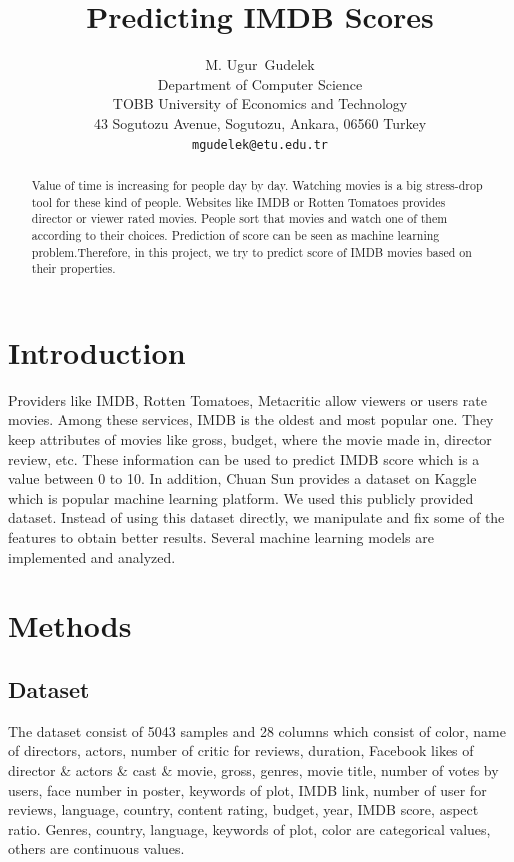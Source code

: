 \documentclass{article}
\title{Predicting IMDB Scores}
\author{
  M. Ugur~Gudelek\\
  Department of Computer Science\\
  TOBB University of Economics and Technology\\
  43 Sogutozu Avenue, Sogutozu, Ankara, 06560 Turkey \\
  \texttt{mgudelek@etu.edu.tr} \\
}
\begin{document}

\maketitle

\begin{abstract}
  Value of time is increasing for people day by day. Watching movies is a big stress-drop tool for these kind of people. Websites like IMDB or Rotten Tomatoes provides director or viewer rated movies. People sort that movies and watch one of them according to their choices. Prediction of score can be seen as machine learning problem.Therefore, in this project, we try to predict score of IMDB movies based on their properties.
\end{abstract}

\section{Introduction}

Providers like IMDB, Rotten Tomatoes, Metacritic allow viewers or users rate movies. Among these services, IMDB is the oldest and most popular one. They keep attributes of movies like gross, budget, where the movie made in, director review, etc. These information can be used to predict IMDB score which is a value between 0 to 10. In addition, Chuan Sun provides a dataset on Kaggle which is popular machine learning platform. We used this publicly provided dataset. Instead of using this dataset directly, we manipulate and fix some of the features to obtain better results. Several machine learning models are implemented and analyzed.

\section{Methods}
\subsection{Dataset}
The dataset consist of 5043 samples and 28 columns which consist of color, name of directors, actors, number of critic for reviews, duration, Facebook likes of director \& actors \& cast \& movie, gross, genres, movie title, number of votes by users, face number in poster, keywords of plot, IMDB link, number of user for reviews, language, country, content rating, budget, year, IMDB score, aspect ratio. Genres, country, language, keywords of plot, color are categorical values, others are continuous values.
\end{document}

